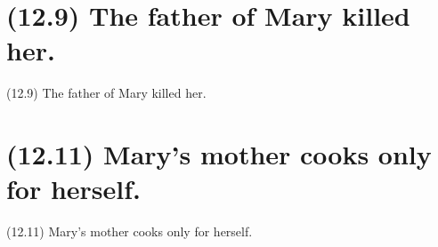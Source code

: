 \documentclass{article}
\begin{document}
\clearpage

%
%

\section*{(12.9) The father of Mary killed her.}

\bigbreak
\begin{enumerate*}
\item[(12.9)] The father of Mary killed her.
\end{enumerate*}
\bigbreak

\bigbreak
\begin{minipage}{\textwidth}
\end{minipage}
\bigbreak

\clearpage

%
%

\section*{(12.11) Mary's mother cooks only for herself.}

\bigbreak
\begin{enumerate*}
\item[(12.11)] Mary's mother cooks only for herself.
\end{enumerate*}
\bigbreak

\bigbreak
\begin{minipage}{\textwidth}
\end{minipage}
\bigbreak
\end{document}
